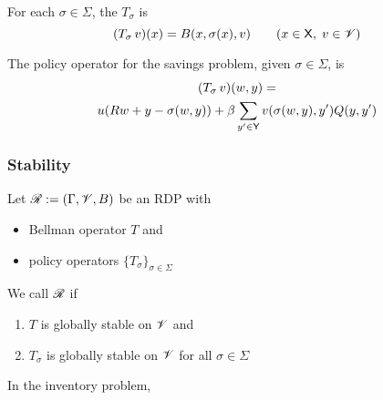 \begin{frame}


    For each $\sigma \in \Sigma$, the  $T_\sigma$ is
    \begin{equation*}
        (T_\sigma \, v)(x) = B(x, \sigma(x), v)
        \qquad (x \in \mathsf X,\; v \in \mathscr V)
    \end{equation*}

    
        \vspace{0.5em}
        \vspace{0.5em}

    \Eg The policy operator for the savings problem, given $\sigma \in
    \Sigma$, is 
    \begin{multline*}
        (T_\sigma \, v)(w, y) = 
        \\
        u(R w + y - \sigma(w, y))
            + \beta \sum_{y' \in \mathsf Y} v(\sigma(w, y), y') Q(y, y')
    \end{multline*}

\end{frame}

\begin{frame}
    \frametitle{Stability}
    
    Let $\mathscr R := (\Gamma, \mathscr V, B)$ be an RDP with 
    \begin{itemize}
        \item Bellman operator $T$ and 
        \item policy operators $\{T_\sigma\}_{\sigma \in \Sigma}$
    \end{itemize}


        \vspace{0.5em}
        \vspace{0.5em}
        \vspace{0.5em}
    We call $\mathscr R$  if
    \begin{enumerate}
        \item $T$ is globally stable on $\mathscr V$ and
        \vspace{0.5em}
        \item $T_\sigma$ is globally stable on $\mathscr V$ for all $\sigma \in \Sigma$
    \end{enumerate}

\end{frame}


\begin{frame}
    
    \Eg In the inventory problem,


\end{frame}




